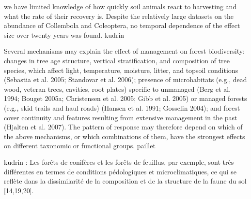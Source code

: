  we have limited knowledge of how quickly soil animals react to harvesting and what the rate of their recovery is.
  Despite the relatively large datasets on the abundance of Collembola and Coleoptera, no temporal dependence of the effect size over twenty years was found. kudrin


  Several mechanisms may explain the effect of management on forest biodiversity: changes in tree age structure, vertical stratification, and composition of tree species, which affect light, temperature, moisture, litter, and topsoil conditions (Sebastia et al. 2005; Standovar et al. 2006); presence of microhabitats (e.g., dead wood, veteran trees, cavities, root plates) specific to unmanaged (Berg et al. 1994; Bouget 2005a; Christensen et al. 2005; Gibb et al. 2005) or managed forests (e.g., skid trails and haul roads) (Hansen et al. 1991; Gosselin 2004); and forest cover continuity and features resulting from extensive management in the past (Hjalten et al. 2007). The pattern of response may therefore depend on which of the above mechanisms, or which combinations of them, have the strongest effects on different taxonomic or functional groups. paillet 

  kudrin :
Les forêts de conifères et les forêts de feuillus, par exemple, sont très différentes en termes de conditions pédologiques et microclimatiques, ce qui se reflète dans la dissimilarité de la composition et de la structure de la faune du sol [14,19,20].






\cleardoublepage


